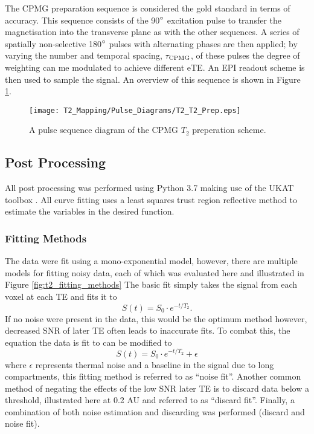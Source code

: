 The \ac{CPMG} \ttwo preparation sequence is considered the gold standard in terms of accuracy. This sequence consists of the 90$\degree$ excitation pulse to transfer the magnetisation into the transverse plane as with the other sequences. A series of spatially non-selective 180$\degree$ pulses with alternating phases are then applied; by varying the number and temporal spacing, $\tau_{\textup{CPMG}}$, of these pulses the degree of \ttwo weighting can me modulated to achieve different \ac{eTE}. An \ac{EPI} readout scheme is then used to sample the signal. An overview of this sequence is shown in Figure \ref{fig:t2_cpmg_t2prep_seq}.

\begin{figure}[H]
	\centering
	\texttt{[image: T2\_Mapping/Pulse\_Diagrams/T2\_T2\_Prep.eps]}
	\caption{A pulse sequence diagram of the \ac{CPMG} $T_2$ preperation scheme.}
	\label{fig:t2_cpmg_t2prep_seq}	
\end{figure}


\subsection{Post Processing}

All post processing was performed using Python 3.7 making use of the \ac{UKAT} toolbox \cite{nery_ukrin_2020}. All curve fitting uses a least squares trust region reflective method to estimate the variables in the desired function.

\subsubsection{\ttwo Fitting Methods}

The data were fit using a mono-exponential model, however, there are multiple models for fitting noisy data, each of which was evaluated here and illustrated in Figure \ref{fig:t2_fitting_methods} The basic fit simply takes the signal from each voxel at each \ac{TE} and fits it to 
\begin{equation}
	S(t) = S_0 \cdot e^{-t/T_2}.
	\label{eq:t2}
\end{equation}
If no noise were present in the data, this would be the optimum method however, decreased SNR of later \ac{TE} often leads to inaccurate fits. To combat this, the equation the data is fit to can be modified to
\begin{equation}
	S(t) = S_0 \cdot e^{-t/T_2} + \epsilon
	\label{eq:t2_noise}
\end{equation}
where $\epsilon$ represents thermal noise and a baseline in the signal due to long \ttwo compartments, this fitting method is referred to as ``noise fit''. Another common method of negating the effects of the low \ac{SNR} later \ac{TE} is to discard data below a threshold, illustrated here at 0.2 AU and referred to as ``discard fit''. Finally, a combination of both noise estimation and discarding was performed (discard and noise fit).

